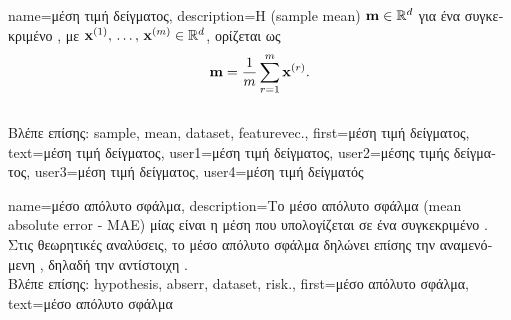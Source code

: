 {name={\foreignlanguage{greek}{μέση τιμή δείγματος}}, 
	description={\foreignlanguage{greek}{Η}  
		 (sample mean) ${\bf m} \in \mathbb{R}^{d}$ \foreignlanguage{greek}{για ένα συγκεκριμένο} 
		, \foreignlanguage{greek}{με}  
		${\bf x}^{(1)}, \,\ldots, \,{\bf x}^{(m)} \in \mathbb{R}^{d}$, 
		\foreignlanguage{greek}{ορίζεται ως}  
		$${\bf m} = \frac{1}{m} \sum_{r=1}^{m} {\bf x}^{(r)}.$$
		\\
		\foreignlanguage{greek}{Βλέπε επίσης:} \gls{sample}, \gls{mean}, \gls{dataset}, \gls{featurevec}.},
	first={\foreignlanguage{greek}{μέση τιμή δείγματος}},
	text={\foreignlanguage{greek}{μέση τιμή δείγματος}},
	user1={\foreignlanguage{greek}{μέση τιμή δείγματος}}, %
	user2={\foreignlanguage{greek}{μέσης τιμής δείγματος}}, %
	user3={\foreignlanguage{greek}{μέση τιμή δείγματος}}, %
	user4={\foreignlanguage{greek}{μέση τιμή δείγματός}} %
}

{name={\foreignlanguage{greek}{μέσο απόλυτο σφάλμα}}, 
	description={\foreignlanguage{greek}{Το μέσο απόλυτο σφάλμα} 
		(mean absolute error - MAE) \foreignlanguage{greek}{μίας}  \foreignlanguage{greek}{είναι η μέση}
        		 \foreignlanguage{greek}{που υπολογίζεται σε ένα συγκεκριμένο} . 
               	\foreignlanguage{greek}{Στις θεωρητικές αναλύσεις, το μέσο απόλυτο σφάλμα δηλώνει επίσης την αναμενόμενη} 
		, \foreignlanguage{greek}{δηλαδή την αντίστοιχη} .
		\\ 
		\foreignlanguage{greek}{Βλέπε επίσης:} \gls{hypothesis}, \gls{abserr}, \gls{dataset}, \gls{risk}.}, 
 	first={\foreignlanguage{greek}{μέσο απόλυτο σφάλμα}}, 
 	text={\foreignlanguage{greek}{μέσο απόλυτο σφάλμα}}
}

